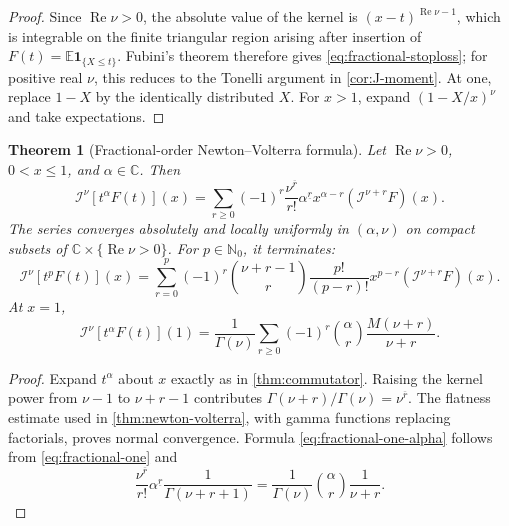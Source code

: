 \documentclass[11pt,oneside]{article}
\newtheorem{theorem}{Theorem}[section]
\theoremstyle{definition}
\theoremstyle{remark}
\newcommand{\E}{\mathbb E}
\newcommand{\C}{\mathbb C}
\newcommand{\N}{\mathbb N}
\newcommand{\fall}[2]{#1^{\underline{#2}}}
\newcommand{\rise}[2]{#1^{\overline{#2}}}
\newcommand{\RL}{\mathcal I}
\newcommand{\1}{\mathbf 1}
\DeclareMathOperator{\Rea}{Re}
\begin{document}
\begin{proof}
Since \(\Rea\nu>0\), the absolute value of the kernel is
\((x-t)^{\Rea\nu-1}\), which is integrable on the finite triangular region
arising after insertion of
\(F(t)=\E\1_{\{X\leq t\}}\).  Fubini's theorem therefore gives
\eqref{eq:fractional-stoploss}; for positive real \(\nu\), this reduces to the
Tonelli argument in \cref{cor:J-moment}.  At one, replace \(1-X\) by the
identically distributed \(X\).  For \(x>1\), expand
\((1-X/x)^\nu\) and take expectations.
\end{proof}

\begin{theorem}[Fractional-order Newton--Volterra formula]\label{thm:fractional-commutator}
Let \(\Rea\nu>0\), \(0<x\leq1\), and \(\alpha\in\C\).  Then
\begin{equation}
 \boxed{\quad
 \RL^\nu[t^\alpha F(t)](x)
 =\sum_{r\geq0}(-1)^r\frac{\rise\nu r}{r!}\fall\alpha r
 x^{\alpha-r}(\RL^{\nu+r}F)(x).
 \quad}                                                        \label{eq:fractional-alpha}
\end{equation}
The series converges absolutely and locally uniformly in \((\alpha,\nu)\) on
compact subsets of \(\C\times\{\Rea\nu>0\}\).  For
\(p\in\N_0\), it terminates:
\begin{equation}
 \RL^\nu[t^pF(t)](x)
 =\sum_{r=0}^p(-1)^r\binom{\nu+r-1}{r}\frac{p!}{(p-r)!}
 x^{p-r}(\RL^{\nu+r}F)(x).                                    \label{eq:fractional-p}
\end{equation}
At \(x=1\),
\begin{equation}
 \boxed{\quad
 \RL^\nu[t^\alpha F(t)](1)
 =\frac1{\Gamma(\nu)}
 \sum_{r\geq0}(-1)^r\binom\alpha r
 \frac{M(\nu+r)}{\nu+r}.
 \quad}                                                        \label{eq:fractional-one-alpha}
\end{equation}
\end{theorem}

\begin{proof}
Expand \(t^\alpha\) about \(x\) exactly as in
\cref{thm:commutator}.  Raising the kernel power from \(\nu-1\) to
\(\nu+r-1\) contributes
\(\Gamma(\nu+r)/\Gamma(\nu)=\rise\nu r\).  The flatness estimate used in
\cref{thm:newton-volterra}, with gamma functions replacing factorials, proves
normal convergence.  Formula \eqref{eq:fractional-one-alpha} follows from
\eqref{eq:fractional-one} and
\[
 \frac{\rise\nu r}{r!}\fall\alpha r
 \frac1{\Gamma(\nu+r+1)}
 =\frac1{\Gamma(\nu)}\binom\alpha r\frac1{\nu+r}.
\]
\end{proof}
\end{document}
